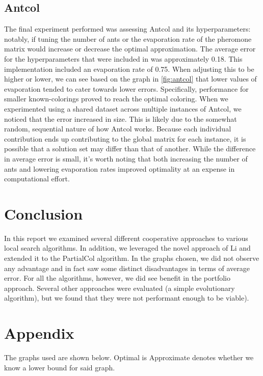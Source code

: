 \documentclass[runningheads]{llncs}
\begin{document}
\subsection{Antcol}

The final experiment performed was assessing Antcol and its hyperparameters: notably, if tuning the number of ants or the evaporation rate of the pheromone matrix would increase or decrease the optimal approximation. The average error for the hyperparameters that were included in \cite{10.5555/2851123} was approximately 0.18. This implementation included an evaporation rate of 0.75. When adjusting this to be higher or lower, we can see based on the graph in \ref{fig:antcol} that lower values of evaporation tended to cater towards lower errors. Specifically, performance for smaller known-colorings proved to reach the optimal coloring. When we experimented using a shared dataset across multiple instances of Antcol, we noticed that the error increased in size. This is likely due to the somewhat random, sequential nature of how Antcol works. Because each individual contribution ends up contributing to the global matrix for each instance, it is possible that a solution set may differ than that of another. While the difference in average error is small, it's worth noting that both increasing the number of ants and lowering evaporation rates improved optimality at an expense in computational effort.

\section{Conclusion}
In this report we examined several different cooperative approaches to various local search algorithms. In addition, we leveraged the novel approach of Li and extended it to the PartialCol algorithm. In the graphs chosen, we did not observe any advantage and in fact saw some distinct disadvantages in terms of average error. For all the algorithms, however, we did see benefit in the portfolio approach. Several other approaches were evaluated (a simple evolutionary algorithm), but we found that they were not performant enough to be viable).


\section{Appendix}

The graphs used are shown below. Optimal is Approximate denotes whether we know a lower bound for said graph.
\end{document}
